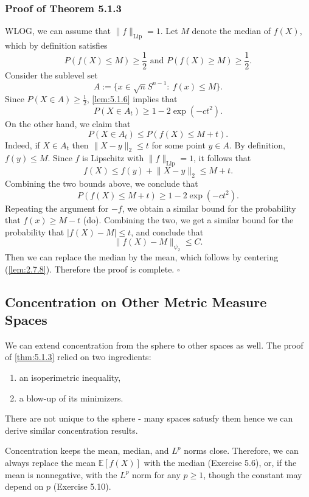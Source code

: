\subsubsection{Proof of Theorem 5.1.3}
WLOG, we can assume that $\lVert f \rVert_{\mathrm{Lip}} = 1$. Let $M$ denote the median of $f(X)$, which 
by definition satisfies 
\[ P(f(X) \leq M) \geq \frac{1}{2} \text{ and } P(f(X) \geq M) \geq \frac{1}{2}. \]
Consider the sublevel set 
\[ A := \{x \in \sqrt{n}S^{n - 1}: \ f(x) \leq M \}. \]
Since $P(X \in A) \geq \frac{1}{2}$, \cref{lem:5.1.6} implies that 
\[ P(X \in A_t) \geq 1 - 2 \exp{(-ct^2)}. \]
On the other hand, we claim that 
\[ P(X \in A_t) \leq P(f(X) \leq M + t). \]
Indeed, if $X \in A_t$ then $\lVert X - y \rVert_{2} \leq t$ for some point $y \in A$. By definition, 
$f(y) \leq M$. Since $f$ is Lipschitz with $\lVert f \rVert_{\mathrm{Lip}} = 1$, it follows that 
\[ f(X) \leq f(y) + \lVert X - y \rVert_{2} \leq M + t. \]
Combining the two bounds above, we conclude that 
\[ P(f(X) \leq M + t) \geq 1 - 2 \exp{(-ct^2)}. \]
Repeating the argument for $-f$, we obtain a similar bound for the probability that $f(x) \geq M - t$ (do). 
Combining the two, we get a similar bound for the probability that $|f(X) - M| \leq t$, and conclude that 
\[ \lVert f(X) - M \rVert_{\psi_2} \leq C. \]
Then we can replace the median by the mean, which follows by centering (\cref{lem:2.7.8}). Therefore the proof 
is complete. $\square$



\subsection{Concentration on Other Metric Measure Spaces}
We can extend concentration from the sphere to other spaces as well. The proof of \cref{thm:5.1.3} relied 
on two ingredients: 
\begin{enumerate}
	\item an isoperimetric inequality,
	\item a blow-up of its minimizers.
\end{enumerate}
There are not unique to the sphere - many spaces satusfy them hence we can derive similar concentration results.

\begin{remark}[]
\label{rmk:5.2.1}
Concentration keeps the mean, median, and $L^p$ norms close. Therefore, we can always replace the mean 
$\mathbb{E}[f(X)]$ with the median (Exercise 5.6), or, if the mean is nonnegative, with the $L^p$ norm for any 
$p \geq 1$, though the constant may depend on $p$ (Exercise 5.10).
\end{remark}


